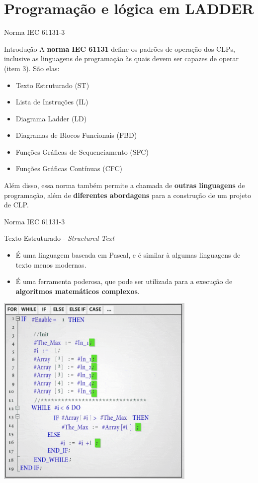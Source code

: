 \section{Programação e lógica em LADDER}


\begin{frame}{Norma IEC 61131-3}
	\begin{block}{Introdução}
		A \textbf{norma IEC 61131} define os padrões de operação dos CLPs, inclusive as linguagens de programação às quais devem ser capazes de operar (item 3). São elas:
		\begin{itemize}
			\item Texto Estruturado (ST)
			\item Lista de Instruções (IL)
			\item Diagrama Ladder (LD)
			\item Diagramas de Blocos Funcionais (FBD)
			\item Funções Gráficas de Sequenciamento (SFC)
			\item Funções Gráficas Contínuas (CFC)
		\end{itemize}
	
		Além disso, essa norma também permite a chamada de \textbf{outras linguagens} de programação, além de \textbf{diferentes abordagens} para a construção de um projeto de CLP.
	\end{block}
\end{frame}


\begin{frame}{Norma IEC 61131-3}
	\begin{block}{Texto Estruturado - \textit{Structured Text}}
		\begin{itemize}
			\item É uma linguagem baseada em Pascal, e é similar à algumas linguagens de texto menos modernas.
			\item É uma ferramenta poderosa, que pode ser utilizada para a execução de \textbf{algoritmos matemáticos complexos}.
		\end{itemize}
	\end{block}

	\centering
	
	\includegraphics[height=0.6\textheight]{Figuras/Ch10/fig1}
	
\end{frame}


